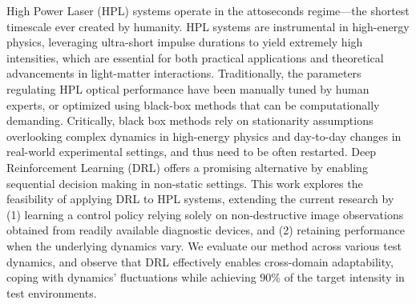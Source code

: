 High Power Laser (HPL) systems operate in the attoseconds regime---the shortest timescale ever created by humanity.
HPL systems are instrumental in high-energy physics, leveraging ultra-short impulse durations to yield extremely high intensities, which are essential for both practical applications and theoretical advancements in light-matter interactions. 
Traditionally, the parameters regulating HPL optical performance have been manually tuned by human experts, or optimized using black-box methods that can be computationally demanding.
Critically, black box methods rely on stationarity assumptions overlooking complex dynamics in high-energy physics and day-to-day changes in real-world experimental settings, and thus need to be often restarted. Deep Reinforcement Learning (DRL) offers a promising alternative by enabling sequential decision making in non-static settings.
This work explores the feasibility of applying DRL to HPL systems, extending the current research by (1) learning a control policy relying solely on non-destructive image observations obtained from readily available diagnostic devices, and (2) retaining performance when the underlying dynamics vary.
We evaluate our method across various test dynamics, and observe that DRL effectively enables cross-domain adaptability, coping with dynamics' fluctuations while achieving 90\% of the target intensity in test environments.